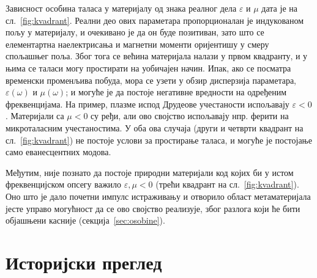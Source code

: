 \documentclass[main.tex]{subfiles}
\begin{document}
Зависност особина таласа у материјалу од знака реалног дела $\varepsilon$ и $\mu$ дата је на сл.~\ref{fig:kvadrant}. Реални део ових параметара пропорционалан је индукованом пољу у материјалу, и очекивано је да он буде позитиван, зато што се елементартна наелектрисања и магнетни моменти оријентишу у смеру спољашњег поља. Због тога се већина материјала налази у првом квадранту, и у њима се таласи могу простирати на уобичајен начин. Ипак, ако се посматра временски променљива побуда, мора се узети у обзир дисперзија параметара, $\varepsilon(\omega)$ и $\mu(\omega)$; и могуће је да постоје негативне вредности на одређеним фреквенцијама. На пример, плазме испод Друдеове учестаности испољавају $\varepsilon < 0$. Материјали са $\mu<0$ су ређи, али ово својство испољавају нпр. ферити на микроталасним учестаностима. У оба ова случаја (други и четврти квадрант на сл.~\ref{fig:kvadrant}) не постоје услови за простирање таласа, и могуће је постојање само еванесцентних модова.

Међутим, није познато да постоје природни материјали код којих би у истом фреквенцијском опсегу важило $\varepsilon,\mu < 0$ (трећи квадрант на сл.~\ref{fig:kvadrant}). Оно што је дало почетни импулс истраживању и отворило област метаматеријала јесте управо могућност да се ово својство реализује, због разлога који ће бити објашњени касније (секција~\ref{sec:osobine}).

\section{Историјски преглед}
\end{document}
